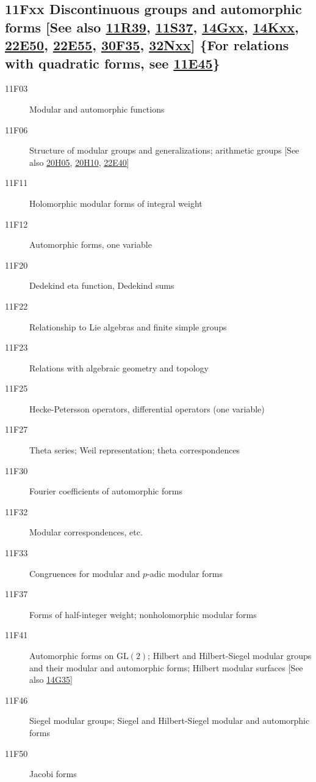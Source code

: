 \documentclass[letterpaper]{article}
\begin{document}
\subsection*{11Fxx  Discontinuous groups and automorphic forms [See also \hyperref[11R39]{11R39}, \hyperref[11S37]{11S37}, \hyperref[14Gxx]{14Gxx}, \hyperref[14Kxx]{14Kxx}, \hyperref[22E50]{22E50}, \hyperref[22E55]{22E55}, \hyperref[30F35]{30F35}, \hyperref[32Nxx]{32Nxx}] \{For relations with quadratic forms, see \hyperref[11E45]{11E45}\} }\label{11Fxx}
\begin{description}  
\item [11F03]\label{11F03} Modular and automorphic functions
\item [11F06]\label{11F06} Structure of modular groups and generalizations; arithmetic groups [See also \hyperref[20H05]{20H05}, \hyperref[20H10]{20H10}, \hyperref[22E40]{22E40}]
\item [11F11]\label{11F11} Holomorphic modular forms of integral weight
\item [11F12]\label{11F12} Automorphic forms, one variable
\item [11F20]\label{11F20} Dedekind eta function, Dedekind sums
\item [11F22]\label{11F22} Relationship to Lie algebras and finite simple groups
\item [11F23]\label{11F23} Relations with algebraic geometry and topology
\item [11F25]\label{11F25} Hecke-Petersson operators, differential operators (one variable)
\item [11F27]\label{11F27} Theta series; Weil representation; theta correspondences
\item [11F30]\label{11F30} Fourier coefficients of automorphic forms
\item [11F32]\label{11F32} Modular correspondences, etc.
\item [11F33]\label{11F33} Congruences for modular and $p$-adic modular forms
\item [11F37]\label{11F37} Forms of half-integer weight; nonholomorphic modular forms
\item [11F41]\label{11F41} Automorphic forms on $\mbox{GL}(2)$; Hilbert and Hilbert-Siegel modular groups and their modular and automorphic forms; Hilbert modular surfaces [See also \hyperref[14G35]{14G35}]
\item [11F46]\label{11F46} Siegel modular groups; Siegel and Hilbert-Siegel modular and automorphic forms
\item [11F50]\label{11F50} Jacobi forms

\end{description}
\end{document}
